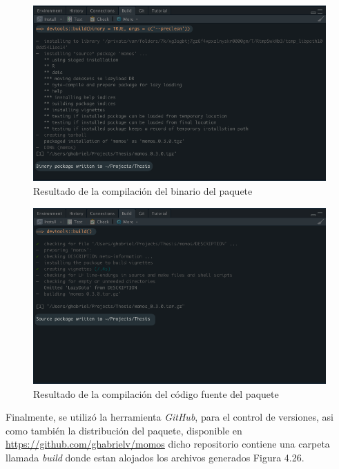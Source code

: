 \begin{figure}[H]
  \centering
    \begin{minipage}{1\textwidth}
      \centering
      \includegraphics[width=1\textwidth]{figure_4_24.png}
      \caption{Resultado de la compilaci\'on del binario del paquete}
      \label{fig:Fig}
    \end{minipage}%
    \hspace{5mm}
\end{figure}

\begin{figure}[H]
  \centering
    \begin{minipage}{1\textwidth}
      \centering
      \includegraphics[width=1\textwidth]{figure_4_25.png}
      \caption{Resultado de la compilaci\'on del c\'odigo fuente del paquete}
      \label{fig:Fig}
    \end{minipage}%
    \hspace{5mm}
\end{figure}

Finalmente, se utiliz\'o la herramienta \textit{GitHub}, para el control de versiones, asi como tambi\'en la distribuci\'on del paquete, disponible en \url{https://github.com/ghabrielv/momos} dicho repositorio contiene una carpeta llamada \textit{build} donde estan alojados los archivos generados Figura 4.26.\\

